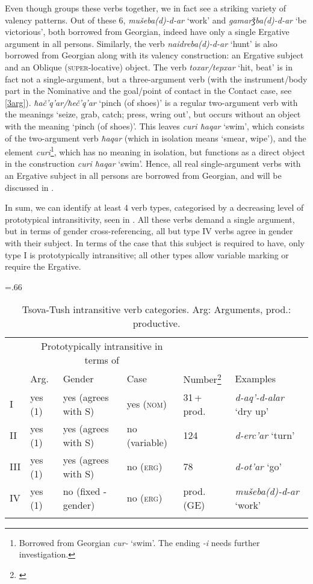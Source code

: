 Even though \textcite[188--189]{holisky84} groups these verbs together, we in fact see a striking variety of valency patterns. Out of these 6, \textit{mušeba(d)-d-ar} `work' and  \textit{gamarǯba(d)-d-ar} `be victorious', both borrowed from Georgian, indeed have only a single Ergative argument in all persons. Similarly, the verb \textit{naidreba(d)-d-ar} `hunt' is also borrowed from Georgian along with its valency construction: an Ergative subject and an Oblique (\textsc{super}-locative) object. The verb \textit{toxar/tepxar} `hit, beat' is in fact not a single-argument, but a three-argument verb (with the instrument/body part in the Nominative and the goal/point of contact in the Contact case, see \ref{3arg}). \textit{ħač'q'ar/ħeč'q'ar} `pinch (of shoes)' is a regular two-argument verb with the meanings `seize, grab, catch; press, wring out', but occurs without an object with the meaning `pinch (of shoes)'. This leaves \textit{curi ħaqar} `swim', which consists of the two-argument verb \textit{ħaqar} (which in isolation means `smear, wipe'), and the element \textit{curi}\footnote{Borrowed from Georgian \textit{cur-} `swim'. The ending \textit{-i} needs further investigation.}, which has no meaning in isolation, but functions as a direct object in the construction \textit{curi ħaqar} `swim'. Hence, all real single-argument verbs with an Ergative subject in all persons are borrowed from Georgian, and will be discussed in .

In sum, we can identify at least 4 verb types, categorised by a decreasing level of prototypical intransitivity, seen in . All these verbs demand a single argument, but in terms of gender cross-referencing, all but type IV verbs agree in gender with their subject. In terms of the  case that this subject is required to have, only type I is prototypically intransitive; all other types allow variable marking or require the Ergative.


\begin{table}
	\small
	\tabcolsep=.66\tabcolsep
	\begin{tabular}{llllll}
    \lsptoprule
		& \multicolumn{3}{c}{{Prototypically intransitive in terms of}} & & \\\cmidrule(lr){2-4}
		& {Arg.} & {Gender}  & {Case} & Number\footnote{\parencite{holisky87}} & {Examples} \\
		\midrule
		I & yes (1) & yes (agrees with S)& yes (\textsc{nom})  & 31\,+\,prod. & \textit{d-aq'-d-alar} `dry up' \\
		II & yes (1) & yes (agrees with S) & no (variable)  & 124 & \textit{d-erc'ar} `turn' \\
		III & yes (1) & yes (agrees with S) & no (\textsc{erg})  & 78 & \textit{d-ot'ar} `go' \\
		IV & yes (1) & no (fixed {\D}-gender) & no (\textsc{erg})  & prod. (GE) & \textit{mušeba(d)-d-ar} `work' \\
		\lspbottomrule
	\end{tabular}
	\caption{Tsova-Tush intransitive verb categories. Arg: Arguments, prod.: productive.}
	\label{verbderiv-table1}
\end{table}


